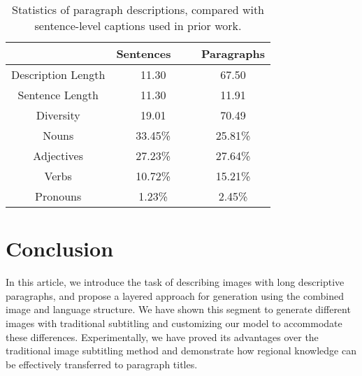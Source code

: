 \documentclass[10pt,twocolumn,letterpaper]{article}
\begin{document}
\begin{table}[tp]%
	\centering 
	\caption{Statistics of paragraph descriptions, compared with sentence-level captions used in prior work.}\label{table1}
		\tabcolsep 0.0001in 
		\begin{tabular} {ccc}
			\hline 
			&	Sentences~~~ &	Paragraphs    \\
			\hline 
			Description Length &11.30& 67.50\\
			Sentence Length &11.30 &11.91\\
			Diversity& 19.01& 70.49\\
			Nouns &33.45\%& 25.81\% \\
			Adjectives& 27.23\%& 27.64\%   \\
			Verbs& 10.72\% &15.21\%   \\
			Pronouns& 1.23\% &2.45\%
  \\
			
			\hline 
			
		\end{tabular}
	\end{table}
\section{Conclusion}
In this article, we introduce the task of describing images with long descriptive paragraphs, and propose a layered approach for generation using the combined image and language structure. We have shown this segment to generate different images with traditional subtitling and customizing our model to accommodate these differences. Experimentally, we have proved its advantages over the traditional image subtitling method and demonstrate how regional knowledge can be effectively transferred to paragraph titles.
{\small
	
	} 
\end{document}
